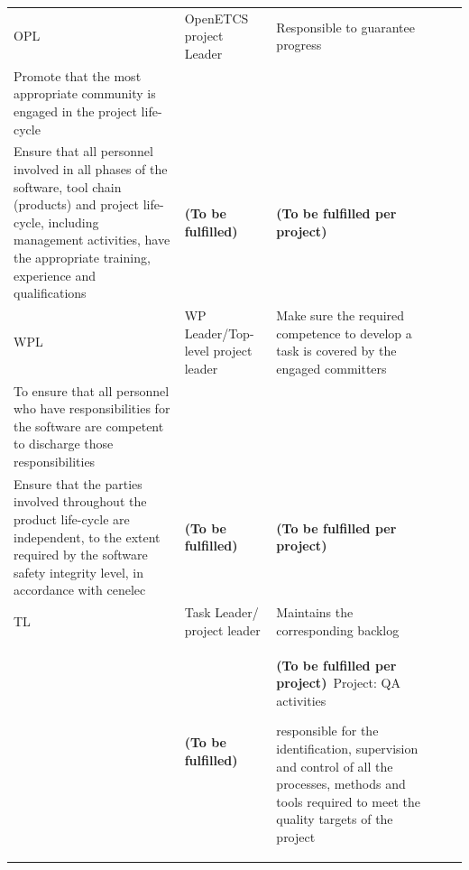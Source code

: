 \documentclass{template/openetcs_article}
\begin{document}
\begin{landscape}
\begin{flushleft}
\begin{supertabular}[H]{|m{1cm}|m{3cm}|m{11cm}|m{4,6cm}|m{4,6cm}|}
\hline
OPL &
OpenETCS project Leader &
\raggedright
Responsible to guarantee progress\\
Promote that the most appropriate community is engaged in the project life-cycle\\
Ensure that all personnel involved in all phases of the software, tool chain (products)  and project life-cycle, including management activities, have the appropriate training, experience and qualifications
&
\textbf{(To be fulfilled)} &
\textbf{(To be fulfilled per project)} \\\hline
WPL &
WP Leader/Top-level project leader &
\raggedright
Make sure the required competence to develop a task is covered by the engaged committers\\
To ensure that all personnel who have responsibilities for the software are competent to discharge those responsibilities\\
Ensure that the parties involved throughout the product life-cycle are independent, to the extent required by the software safety integrity level, in accordance with cenelec
&
\textbf{(To be fulfilled)} &
\textbf{(To be fulfilled per project)} \\\hline
TL &
Task Leader/ project leader &
\raggedright
Maintains the corresponding backlog\\
&
\textbf{(To be fulfilled)} &
\textbf{(To be fulfilled per project)}\
Project: QA activities
\begin{description}
\item responsible for the identification, supervision and control of all the processes, methods and tools required to meet the quality targets of the project

\end{description}
\end{supertabular}
\end{flushleft}
\end{landscape}
\end{document}
